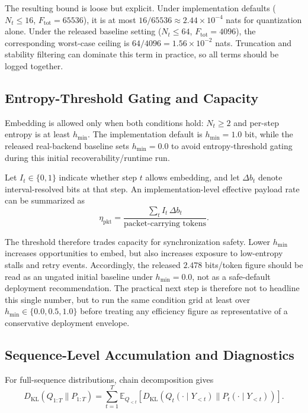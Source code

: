 The resulting bound is loose but explicit. Under implementation defaults ($N_t\le16$, $F_{\mathrm{tot}}=65536$), it is at most $16/65536 \approx 2.44\times10^{-4}$ nats for quantization alone. Under the released baseline setting ($N_t\le64$, $F_{\mathrm{tot}}=4096$), the corresponding worst-case ceiling is $64/4096 = 1.56\times10^{-2}$ nats. Truncation and stability filtering can dominate this term in practice, so all terms should be logged together.

\subsection{Entropy-Threshold Gating and Capacity}

Embedding is allowed only when both conditions hold: $N_t\ge2$ and per-step entropy is at least $h_{\min}$.
The implementation default is $h_{\min}=1.0$ bit, while the released real-backend baseline sets $h_{\min}=0.0$ to avoid entropy-threshold gating during this initial recoverability/runtime run.

Let $I_t\in\{0,1\}$ indicate whether step $t$ allows embedding, and let $\Delta b_t$ denote interval-resolved bits at that step.
An implementation-level effective payload rate can be summarized as
\begin{equation}
\eta_{\mathrm{pkt}}=\frac{\sum_t I_t\,\Delta b_t}{\text{packet-carrying tokens}}.
\end{equation}

The threshold therefore trades capacity for synchronization safety.
Lower $h_{\min}$ increases opportunities to embed, but also increases exposure to low-entropy stalls and retry events. Accordingly, the released $2.478$ bits/token figure should be read as an ungated initial baseline under $h_{\min}=0.0$, not as a safe-default deployment recommendation.
The practical next step is therefore not to headline this single number, but to run the same condition grid at least over $h_{\min}\in\{0.0,0.5,1.0\}$ before treating any efficiency figure as representative of a conservative deployment envelope.

\subsection{Sequence-Level Accumulation and Diagnostics}

For full-sequence distributions, chain decomposition gives
\begin{equation}
D_{\mathrm{KL}}(Q_{1:T}\|P_{1:T})
=\sum_{t=1}^{T}\mathbb{E}_{Q_{<t}}\left[D_{\mathrm{KL}}(Q_t(\cdot\mid Y_{<t})\|P_t(\cdot\mid Y_{<t}))\right].
\end{equation}

